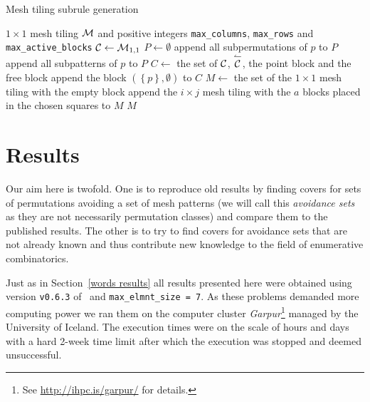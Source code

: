 \begin{algorithm}[ht]
  \caption{Mesh tiling subrule generation}
  \begin{algorithmic}
  \REQUIRE $1 \times 1$ mesh tiling ${\mathcal{M}}$ and positive integers \texttt{max\_columns}, \texttt{max\_rows} and \texttt{max\_active\_blocks}
  \STATE ${\mathcal{C}} \leftarrow {\mathcal{M}}_{1, 1}$
  \STATE $P \leftarrow \emptyset$
      \STATE append all subpermutations of $p$ to $P$
      \STATE append all subpatterns of $p$ to $P$
    \ENDIF
  \ENDFOR
  \STATE $C \leftarrow$ the set of ${\mathcal{C}}$, $\overset{\leftharpoonup}{{\mathcal{C}}}$, the point block and the free block
    \STATE append the block $\left( \left\{ p \right\}, \emptyset \right)$ to $C$
  \ENDFOR
  \STATE $M \leftarrow$ the set of the $1 \times 1$ mesh tiling with the empty block
        \STATE append the $i \times j$ mesh tiling with the $a$ blocks placed in the chosen squares to $M$
      \ENDFOR
    \ENDFOR
  \ENDFOR
  \ENDFOR
  \ENDFOR
  \RETURN $M$
  \end{algorithmic}
  \label{algorithm:mesh tiling subrule generation}
\end{algorithm}



\section{Results\label{mesh tilings results}}

Our aim here is twofold. One is to reproduce old results by finding covers for 
sets of permutations avoiding a set of mesh patterns (we will call this 
\emph{avoidance sets} as they are not necessarily permutation classes) and 
compare them to the published results. The other is to try to find covers for 
avoidance sets that are not already known and thus contribute new knowledge to 
the field of enumerative combinatorics.

Just as in Section~\ref{words results} all results presented here were obtained 
using version \texttt{v0.6.3} of \CombCov\ and \texttt{max\_elmnt\_size = 7}.
As these problems demanded more computing power we ran them on the computer 
cluster \emph{Garpur}\footnote{See \url{http://ihpc.is/garpur/} for details.} 
managed by the University of Iceland. The execution times were on the scale of 
hours and days with a hard 2-week time limit after which the execution was 
stopped and deemed unsuccessful.


